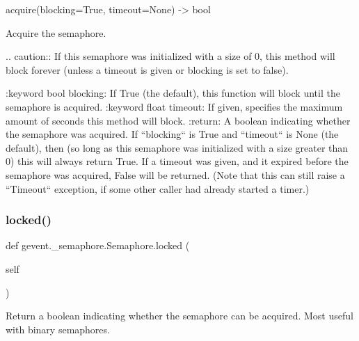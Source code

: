 \begin{DoxyVerb}acquire(blocking=True, timeout=None) -> bool

Acquire the semaphore.

.. caution:: If this semaphore was initialized with a size of 0,
   this method will block forever (unless a timeout is given or blocking is
   set to false).

:keyword bool blocking: If True (the default), this function will block
   until the semaphore is acquired.
:keyword float timeout: If given, specifies the maximum amount of seconds
   this method will block.
:return: A boolean indicating whether the semaphore was acquired.
   If ``blocking`` is True and ``timeout`` is None (the default), then
   (so long as this semaphore was initialized with a size greater than 0)
   this will always return True. If a timeout was given, and it expired before
   the semaphore was acquired, False will be returned. (Note that this can still
   raise a ``Timeout`` exception, if some other caller had already started a timer.)
\end{DoxyVerb}
 \mbox{\label{classgevent_1_1__semaphore_1_1_semaphore_a3d8aae11706959b43e675d25bb587ad3}} 
\subsubsection{\texorpdfstring{locked()}{locked()}}
{\footnotesize\ttfamily def gevent.\+\_\+semaphore.\+Semaphore.\+locked (\begin{DoxyParamCaption}\item[{}]{self }\end{DoxyParamCaption})}

\begin{DoxyVerb}Return a boolean indicating whether the semaphore can be acquired.
Most useful with binary semaphores.\end{DoxyVerb}
 \mbox{\label{classgevent_1_1__semaphore_1_1_semaphore_a000832ddde5e835f5585ee3ca9327f34}} 
